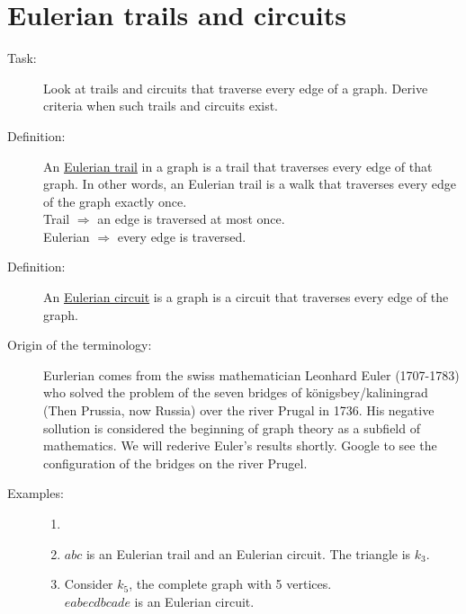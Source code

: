 \documentclass[10pt]{article}
\begin{document}
	\section{Eulerian trails and circuits}
	\begin{description}
		\item[Task:] Look at trails and circuits that traverse every edge of a graph. Derive criteria when such trails and circuits exist.
		\item[Definition:] An \underline{Eulerian trail} in a graph is a trail that traverses every edge of that graph. In other words, an Eulerian trail is a walk that traverses every edge of the graph exactly once. \\
		Trail $\Rightarrow$ an edge is traversed at most once. \\
		Eulerian $\Rightarrow$ every edge is traversed.
		\item[Definition:] An \underline{Eulerian circuit} is a graph is a circuit that traverses every edge of the graph.
		\item[Origin of the terminology:] Eurlerian comes from the swiss mathematician Leonhard Euler (1707-1783) who solved the problem of the seven bridges of k\"onigsbey/kaliningrad (Then Prussia, now Russia) over the river Prugal in 1736. His negative sollution is considered the beginning of graph theory as a subfield of mathematics. We will rederive Euler's results shortly. Google to see the configuration of the bridges on the river Prugel.
		\item[Examples:]
		\begin{enumerate}
			\item[]
			\item $abc$ is an Eulerian trail and an Eulerian circuit. The triangle is $k_3$.
			\begin{figure}[h!]
				\centering
			\end{figure}
			\item Consider $k_5$, the complete graph with 5 vertices. \\
			$eabecdbcade$ is an Eulerian circuit.
			\begin{figure}[h!]
				\centering
\end{figure}
\end{enumerate}
\end{description}
\end{document}
